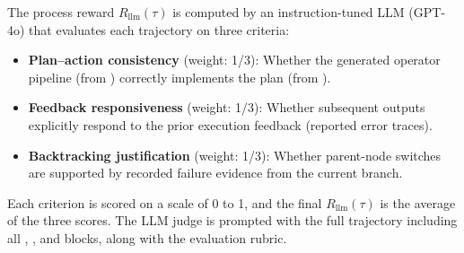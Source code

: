 The process reward $R_{\text{llm}}(\tau)$ is computed by an instruction-tuned LLM (\eg GPT-4o) that evaluates each trajectory on three criteria:
\begin{itemize}[leftmargin=*]
    \item \textbf{Plan--action consistency} (weight: 1/3): Whether the generated operator pipeline (from ) correctly implements the plan (from ).
    \item \textbf{Feedback responsiveness} (weight: 1/3): Whether subsequent  outputs explicitly respond to the prior execution feedback (\eg reported error traces).
    \item \textbf{Backtracking justification} (weight: 1/3): Whether parent-node switches are supported by recorded failure evidence from the current branch.
\end{itemize}
Each criterion is scored on a scale of 0 to 1, and the final $R_{\text{llm}}(\tau)$ is the average of the three scores. The LLM judge is prompted with the full trajectory including all , , and  blocks, along with the evaluation rubric.

